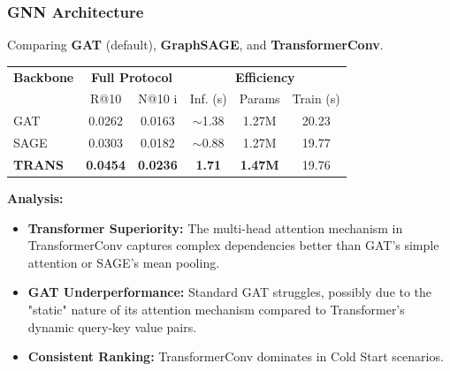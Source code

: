 \documentclass{beamer}
\begin{document}
\begin{frame}
    \frametitle{GNN Architecture}
    Comparing \textbf{GAT} (default), \textbf{GraphSAGE}, and \textbf{TransformerConv}.
    \vspace{0.2cm}
    \begin{table}
        \centering
        \scriptsize
        \setlength{\tabcolsep}{3pt}
        \begin{tabular}{l|cc|ccc}
            \toprule
            \textbf{Backbone}                  & \multicolumn{2}{c|}{\textbf{Full Protocol}} & \multicolumn{3}{c}{\textbf{Efficiency}}                                              \\
                                               & R@10                                        & N@10              i                     & Inf. (s)      & Params         & Train (s) \\
            \midrule
            GAT                                & 0.0262                                      & 0.0163                                  & $\sim$1.38    & 1.27M          & 20.23     \\
            SAGE                               & 0.0303                                      & 0.0182                                  & $\sim$0.88    & 1.27M          & 19.77     \\
            \rowcolor{green!15} \textbf{TRANS} & \textbf{0.0454}                             & \textbf{0.0236}                         & \textbf{1.71} & \textbf{1.47M} & 19.76     \\
            \bottomrule
        \end{tabular}
    \end{table}

    \vspace{0.2cm}
    \textbf{Analysis:}
    \begin{itemize}
        \item \textbf{Transformer Superiority:} The multi-head attention mechanism in TransformerConv captures complex dependencies better than GAT's simple attention or SAGE's mean pooling.
        \item \textbf{GAT Underperformance:} Standard GAT struggles, possibly due to the "static" nature of its attention mechanism compared to Transformer's dynamic query-key value pairs.
        \item \textbf{Consistent Ranking:} TransformerConv dominates in Cold Start scenarios.
    \end{itemize}
\end{frame}
\end{document}
